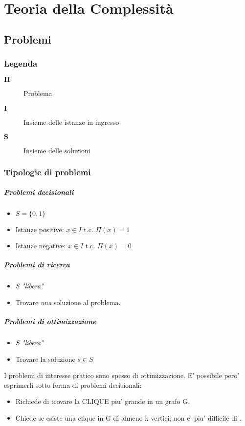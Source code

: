 \chapter{Teoria della Complessità}
\section{Problemi}
\subsection{Legenda}
\begin{description}
    \item[$\mathbf{\Pi}$] Problema
    \item[$\mathbf{I}$] Insieme delle istanze in ingresso
    \item[$\mathbf{S}$] Insieme delle soluzioni  
\end{description}
\subsection{Tipologie di problemi}
\paragraph{Problemi decisionali}
\begin{itemize}
    \item $S = \{0, 1\}$
    \item Istanze positive: $x \in I$ t.c. $\Pi(x) = 1$
    \item Istanze negative: $x \in I$ t.c. $\Pi(x) = 0$
\end{itemize}
\paragraph{Problemi di ricerca}
\begin{itemize}
    \item $S$ \textit{"libera"}
    \item Trovare \textit{una} soluzione al problema.
\end{itemize}
\paragraph{Problemi di ottimizzazione}
\begin{itemize}
    \item $S$ \textit{"libera"}
    \item Trovare la  soluzione $s \in S$
\end{itemize}
I problemi di interesse pratico sono spesso di ottimizzazione. E' possibile pero' esprimerli sotto forma di problemi decisionali:
\begin{itemize}
    \item {} Richiede di trovare la CLIQUE piu' grande in un grafo G.
    \item {} Chiede se esiste una clique in G di almeno k vertici; non e' piu' difficile di .
\end{itemize}
